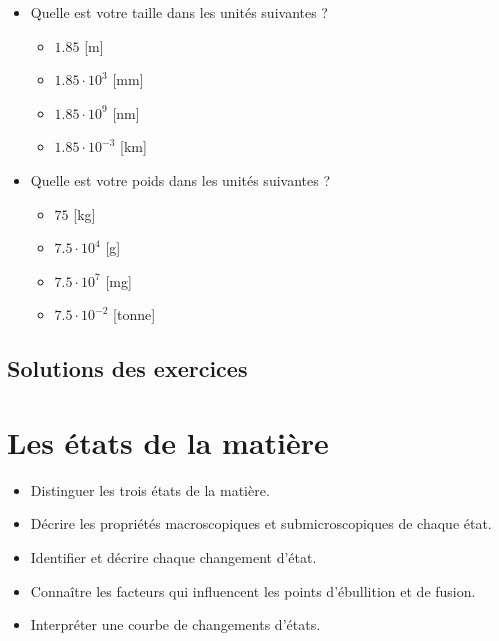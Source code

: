 \documentclass[
  11pt,
  french,
  a4paper,
  openany]{book}
\providecommand{\tightlist}{%
  \setlength{\itemsep}{0pt}\setlength{\parskip}{0pt}}
\begin{document}
\begin{Answer}

\begin{itemize}
\tightlist
\item
  Quelle est votre taille dans les unités suivantes ?

  \begin{itemize}
  \tightlist
  \item
    \(1.85\) {[}m{]}
  \item
    \(1.85 \cdot 10^3\) {[}mm{]}
  \item
    \(1.85 \cdot 10^9\) {[}nm{]}
  \item
    \(1.85 \cdot 10^{-3}\) {[}km{]}
  \end{itemize}
\item
  Quelle est votre poids dans les unités suivantes ?

  \begin{itemize}
  \tightlist
  \item
    \(75\) {[}kg{]}
  \item
    \(7.5 \cdot 10^4\) {[}g{]}
  \item
    \(7.5 \cdot 10^7\) {[}mg{]}
  \item
    \(7.5 \cdot 10^{-2}\) {[}tonne{]}
  \end{itemize}
\end{itemize}


\end{Answer}

\newpage

\section{Solutions des exercices} \shipoutAnswer

\hypertarget{les-uxe9tats-de-la-matiuxe8re}{%
\chapter{Les états de la matière}\label{les-uxe9tats-de-la-matiuxe8re}}

\begin{objectives}

\begin{itemize}
\tightlist
\item
  Distinguer les trois états de la matière.
\item
  Décrire les propriétés macroscopiques et submicroscopiques de chaque état.
\item
  Identifier et décrire chaque changement d'état.
\item
  Connaître les facteurs qui influencent les points d'ébullition et de fusion.
\item
  Interpréter une courbe de changements d'états.
\end{itemize}


\end{objectives}
\end{document}

